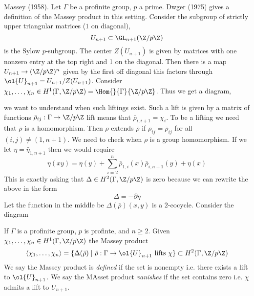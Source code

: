 \documentclass{article}
\begin{document}
Massey (1958). Let $\Gamma$ be a profinite group, $p$ a prime. Dwger (1975) gives a definition of the Massey product in this setting. Consider the subgroup of strictly upper triangular matrices ($1$ on diagonal),
\[ U_{n+1} \subset \GL_{n+1}(\Z / p \Z) \]
is the Sylow $p$-subgroup. The center $Z(U_{n+1})$ is given by matrices with one nonzero entry at the top right and 1 on the diagonal. Then there is a map $U_{n+1} \to (\Z / p \Z)^n$ given by the first off diagonal this factors through $\ol{U}_{n+1} = U_{n+1} / Z(U_{n+1})$. Consider $\chi_1, \dots, \chi_n \in H^1(\Gamma, \Z / p \Z) = \Hom{}{\Gamma}{\Z / p \Z}$. Thus we get a diagram,
\begin{center}
\end{center} 
we want to understand when such liftings exist. Such a lift is given by a matrix of functions $\bar{\rho}_{ij} : \Gamma \to \Z / p \Z$ lift means that $\bar{\rho}_{i,i+1} = \chi_i$. To be a lifting we need that $\bar{\rho}$ is a homomorphism. Then $\rho$ extends $\bar{\rho}$ if $\rho_{ij} = \bar{\rho}_{ij}$ for all $(i,j) \neq (1, n+1)$. We need to check when $\rho$ is a group homomorphism. If we let $\eta = \bar{\eta}_{1,n+1}$ then we would require
\[ \eta(xy) = \eta(y) + \sum_{i = 2}^n \bar{\rho}_{1,i}(x) \bar{\rho}_{i, n+1}(y) + \eta(x) \]
This is exactly asking that $\Delta \in H^2(\Gamma, \Z / p \Z)$ is zero because we can rewrite the above in the form
\[ \Delta = - \partial \eta \]
Let the function in the middle be $\Delta(\bar{\rho})(x,y)$ is a $2$-cocycle. Consider the diagram
\begin{center}
\end{center} 

\begin{defn}
If $\Gamma$ is a profinite group, $p$ is profinte, and $n \ge 2$. Given $\chi_1, \dots, \chi_n \in H^1(\Gamma, \Z / p \Z)$ the Massey product
\[ \left< \chi_1, \dots, \chi_n \right> = \{ \Delta(\bar{\rho}) \mid \bar{\rho} : \Gamma \to \ol{U}_{n+1} \text{ lifts } \chi \} \subset H^2(\Gamma, \Z / p \Z) \]
We say the Massey product is \textit{defined} if the set is nonempty i.e. there exists a lift to $\ol{U}_{n+1}$. We say the MAsset product \textit{vanishes} if the set contains zero i.e. $\chi$ admits a lift to $U_{n+1}$. 
\end{defn}
\end{document}

